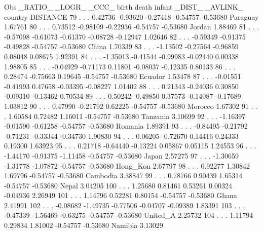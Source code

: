 \documentclass{article}
\begin{document}
\begin{Woutput}
Obs _RATIO_  _LOGR_  _CCC_    birth     death    infant    _DIST_   _AVLINK_  country   DISTANCE
 79    .        .      .     0.42736  -0.93620  -0.27418  -0.54757  -0.53680  Paraguay   1.67761
 80    .        .      .     0.73512  -0.98109  -0.22936  -0.54757  -0.53680  Jordan     1.88469
 81    .        .      .    -0.57098  -0.61073  -0.61370  -0.08728  -0.12947             1.02646
 82    .        .      .    -0.59349  -0.91375  -0.49828  -0.54757  -0.53680  China      1.70339
 83    .        .      .    -1.13502  -0.27564  -0.96859   0.08048   0.08675             1.92391
 84    .        .      .    -1.35013  -0.41544  -0.99983  -0.02440   0.00338             1.98805
 85    .        .      .    -0.04929  -0.71173   0.11801  -0.08037  -0.12335             0.80133
 86    .        .      .     0.28474  -0.75663   0.19645  -0.54757  -0.53680  Ecuador    1.53478
 87    .        .      .    -0.01551  -0.41993   0.47658  -0.03395  -0.08227             1.01402
 88    .        .      .     0.21343  -0.24036   0.30850  -0.09310  -0.13462             0.70534
 89    .        .      .     0.50242  -0.49850   0.37573  -0.14087  -0.17689             1.03812
 90    .        .      .     0.47990  -0.21792   0.62225  -0.54757  -0.53680  Morocco    1.67302
 91    .        .      .     1.60584   0.72482   1.16011  -0.54757  -0.53680  Tanzania   3.10699
 92    .        .      .    -1.16397  -0.01590  -0.61258  -0.54757  -0.53680  Romania    1.89391
 93    .        .      .    -0.84495  -0.21792  -0.71231  -0.33344  -0.34730             1.90830
 94    .        .      .     0.06205  -0.72670   0.14416   0.24333   0.19300             1.63923
 95    .        .      .     0.21718  -0.64440  -0.13224   0.05867   0.05115             1.24553
 96    .        .      .    -1.44170  -0.91375  -1.11458  -0.54757  -0.53680  Japan      2.57275
 97    .        .      .    -1.30659  -1.31778  -1.07872  -0.54757  -0.53680  Hong_Kon   2.67797
 98    .        .      .     0.92277   1.30842   1.69796  -0.54757  -0.53680  Cambodia   3.38847
 99    .        .      .     0.78766   0.90439   1.65314  -0.54757  -0.53680  Nepal      3.04205
100    .        .      .     1.25680   0.81461   0.53261   0.00324  -0.04936             2.26949
101    .        .      .     1.14796   0.52281   0.80154  -0.54757  -0.53680  Ghana      2.41991
102    .        .      .    -0.08682  -1.49735  -0.77506  -0.04707  -0.09389             1.83391
103    .        .      .    -0.47339  -1.56469  -0.63275  -0.54757  -0.53680  United_A   2.25732
104    .        .      .     1.11794   0.29834   1.81002  -0.54757  -0.53680  Namibia    3.13029


\end{Woutput}
\end{document}
